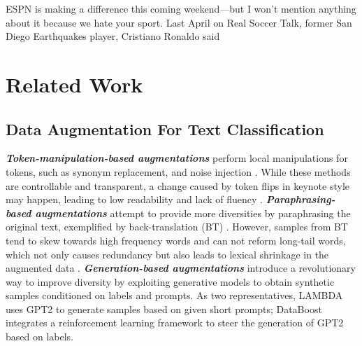 ESPN is making a difference this coming weekend—but I won't mention anything about it because we hate your sport. Last April on Real Soccer Talk, former San Diego Earthquakes player, Cristiano Ronaldo said




\toprule

\midrule 

\midrule
\bottomrule




\section{Related Work}

\subsection{Data Augmentation For Text Classification}

{\textbf{\textit{Token-manipulation-based augmentations}}}
perform local manipulations for tokens, such as synonym replacement, and noise injection \cite{wei2019eda,miller1990introduction,kolomiyets2011model,miao2020snippext,kobayashi2018contextual,wu2019conditional}. While these methods are controllable and transparent, 
a change caused by token flips in keynote style may happen, leading to low readability and lack of fluency \cite{kolomiyets2011model,chen2021empirical,bayer2021survey}. \noindent \textbf{\textit{Paraphrasing-based augmentations}} attempt to provide more diversities by paraphrasing the original text, exemplified by back-translation (BT) \cite{sennrich2016improving,edunov-etal-2018-understanding}. However, samples from BT tend to skew towards high frequency words and can not reform long-tail words, which not only causes redundancy but also leads to lexical shrinkage in the augmented data \cite{liu2020data}. 
\noindent \textbf{\textit{Generation-based augmentations}} introduce a revolutionary way to improve diversity by exploiting generative models to obtain synthetic samples conditioned on labels and prompts. 
As two representatives, 
LAMBDA \cite{anaby2019not} uses GPT2 to generate samples based on given short prompts;
DataBoost \cite{liu2020data} integrates a reinforcement learning framework to steer the generation of GPT2 based on labels. 

